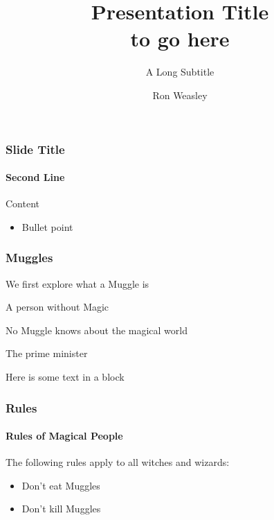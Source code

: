 \documentclass[aspectratio=169]{beamer}
\title{Presentation Title\\to go here}
\subtitle{A Long Subtitle}
\author{Ron Weasley}
\institute[Computer Science]{Liverpool}
\begin{document}
\begin{frame}
\maketitle
\end{frame}


\begin{frame}[t]
    \frametitle{Slide Title}
    \framesubtitle{Second Line}

    Content
    \begin{itemize}
        \item Bullet point
    \end{itemize}
\end{frame}


 
\begin{frame}
\frametitle{Muggles}
We first explore what a Muggle is 

\begin{definition}[Muggle]
A person without Magic
\end{definition}

\begin{theorem}
No Muggle knows about the magical world
\end{theorem} 

\begin{example}[Muggle]
The prime minister
\end{example}

\end{frame}


\begin{frame}[t]

    \vspace{2cm}
    {\LARGE{}}
    \begin{block}{Here is some text in a block}
        \lipsum[1][1-5]
    \end{block}
    
\end{frame}


\begin{frame}
\frametitle{Rules}
\framesubtitle{Rules of Magical People}

The following rules apply to all witches and wizards:
\begin{itemize}
\item Don't eat Muggles
\item Don't kill Muggles
\end{itemize}

\end{frame}
\end{document}
